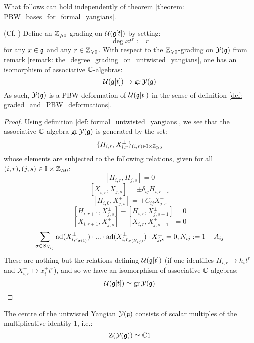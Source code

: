         What follows can hold independently of theorem \ref{theorem: PBW_bases_for_formal_yangians}. 
        \begin{lemma} \label{lemma: untwisted_yangians_as_PBW_deformations}
            (Cf. \cite[Proposition 12.1.6]{chari_pressley_quantum_groups}) Define an $\mathbb{Z}_{\geqslant 0}$-grading on $\mathcal{U}(\mathfrak{g}[t])$ by setting:
                $$\deg x t^r := r$$
            for any $x \in \mathfrak{g}$ and any $r \in \mathbb{Z}_{\geqslant 0}$. With respect to the $\mathbb{Z}_{\geqslant 0}$-grading on $\mathcal{Y}(\mathfrak{g})$ from remark \ref{remark: the_degree_grading_on_untwisted_yangians}, one has an isomorphism of associative $\mathbb{C}$-algebras:
                $$\mathcal{U}( \mathfrak{g}[t] ) \to \operatorname{gr} \mathcal{Y}(\mathfrak{g})$$
            As such, $\mathcal{Y}(\mathfrak{g})$ is a PBW deformation of $\mathcal{U}(\mathfrak{g}[t])$ in the sense of definition \ref{def: graded_and_PBW_deformations}.
        \end{lemma}
            \begin{proof}
                Using definition \ref{def: formal_untwisted_yangians}, we see that the associative $\mathbb{C}$-algebra $\operatorname{gr} \mathcal{Y}(\mathfrak{g})$ is generated by the set:
                    $$\{ H_{i, r}, X_{i, r}^{\pm} \}_{(i ,r) \in \simpleroots \x \Z_{\geq 0}}$$
                whose elements are subjected to the following relations, given for all $(i, r), (j, s) \in \simpleroots \x \Z_{\geq 0}$:
                    $$[ H_{i, r}, H_{j, s} ] = 0$$
                    $$[ X_{i, r}^+, X_{j, s}^- ] = \pm \delta_{ij} H_{i, r + s}$$
                    $$[ H_{i, 0}, X_{j, s}^{\pm} ] = \pm C_{ij} X_{j, s}^{\pm}$$
                    $$[ H_{i, r + 1}, X_{j, s}^{\pm} ] - [ H_{i, r}, X_{j, s + 1}^{\pm} ] = 0$$
                    $$[ X_{i, r + 1}, X_{j, s}^{\pm} ] - [ X_{i, r}, X_{j, s + 1}^{\pm} ] = 0$$
                    $$\sum_{\sigma \in S_{N_{ij}}} \mathrm{ad}(X_{i, r_{\sigma(1)}}^{\pm}) \cdot ... \cdot \mathrm{ad}(X_{i, r_{\sigma(N_{ij})}}^{\pm}) \cdot X_{j, s}^{\pm} = 0, N_{ij} := 1 - A_{ij}$$
                These are nothing but the relations defining $\mathcal{U}( \mathfrak{g}[t] )$ (if one identifies $H_{i, r} \mapsto h_i t^r$ and $X_{i, r}^{\pm} \mapsto x_i^{\pm} t^r$), and so we have an isomorphism of associative $\mathbb{C}$-algebras:
                    $$\mathcal{U}( \mathfrak{g}[t] ) \simeq \operatorname{gr} \mathcal{Y}(\mathfrak{g})$$ 
            \end{proof}
        \begin{corollary} \label{coro: centres_of_untwisted_yangians}
            The centre of the untwisted Yangian $\mathcal{Y}(\mathfrak{g})$ consists of scalar multiples of the multiplicative identity $1$, i.e.:
                $$\mathrm{Z}( \mathcal{Y}(\mathfrak{g}) ) \simeq \mathbb{C} 1$$
        \end{corollary}
